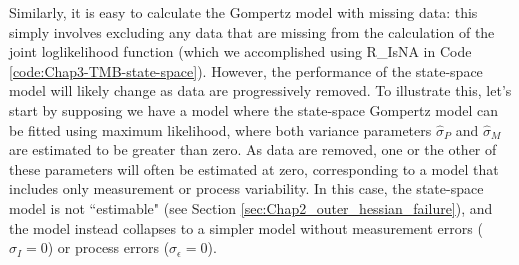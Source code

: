 Similarly, it is easy to calculate the Gompertz model with missing data: this simply involves excluding any data that are missing from the calculation of the joint loglikelihood function (which we accomplished using \colorbox{backblue}{R\_IsNA} in Code \ref{code:Chap3-TMB-state-space}).  However, the performance of the state-space model will likely change as data are progressively removed. To illustrate this, let's start by supposing we have a model where the state-space Gompertz model can be fitted using maximum likelihood, where both variance parameters \( \hat{\sigma}_P\) and \(\hat{\sigma}_M\) are estimated to be greater than zero.  As data are removed, one or the other of these parameters will often be estimated at zero, corresponding to a model that includes only measurement or process variability.  In this case, the state-space model is not ``estimable" (see Section \ref{sec:Chap2_outer_hessian_failure}), and the model instead collapses to a simpler model without measurement errors (\(\sigma_I=0\)) or process errors (\(\sigma_{\epsilon}=0\)).  

